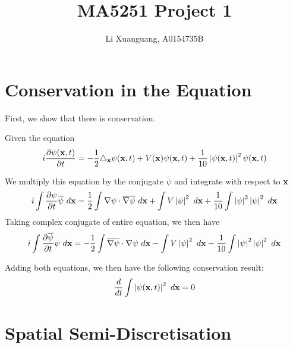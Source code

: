 \documentclass[a4paper,8pt]{article}
\title{MA5251 Project 1}
\author{Li Xuanguang, A0154735B}
\begin{document}
\maketitle


\raggedright

\newpage

\tableofcontents

\newpage


\section{Conservation in the Equation}

First, we show that there is conservation. \newline

Given the equation
\begin{equation}
i \frac{\partial \psi(\bold{x}, t)}{\partial t} = -\frac{1}{2} \triangle_{\bold{x}} \psi(\bold{x}, t) + V(\bold{x}) \psi(\bold{x}, t) + \frac{1}{10} \left\lvert\psi(\bold{x}, t)\right\rvert^2 \psi(\bold{x}, t) \nonumber
\end{equation}

We multiply this equation by the conjugate $\overline{\psi}$ and integrate with respect to $\bold{x}$
\begin{equation}
i \int \frac{\partial \psi}{\partial t} \overline{\psi} \ d \bold{x} = \frac{1}{2} \int \nabla\psi \cdot \overline{\nabla \psi} \ d \bold{x} + \int V \left\lvert\psi\right\rvert^2 \ d \bold{x} + \frac{1}{10} \int \left\lvert\psi\right\rvert^2 \left\lvert\psi\right\rvert^2  \ d \bold{x} \nonumber
\end{equation}
Taking complex conjugate of entire equation, we then have
\begin{equation}
i \int \frac{\partial \overline{\psi}}{\partial t} \psi \ d \bold{x} = - \frac{1}{2} \int \overline{\nabla \psi} \cdot \nabla\psi \ d \bold{x} - \int V \left\lvert\psi\right\rvert^2 \ d \bold{x} - \frac{1}{10} \int \left\lvert\psi\right\rvert^2 \left\lvert\psi\right\rvert^2  \ d \bold{x} \nonumber
\end{equation}

Adding both equations, we then have the following conservation result:
\begin{equation}
\frac{d}{dt} \int \left\lvert\psi(\bold{x}, t)\right\rvert^2 \ d \bold{x} = 0 \nonumber
\end{equation}

\section{Spatial Semi-Discretisation}
\end{document}
